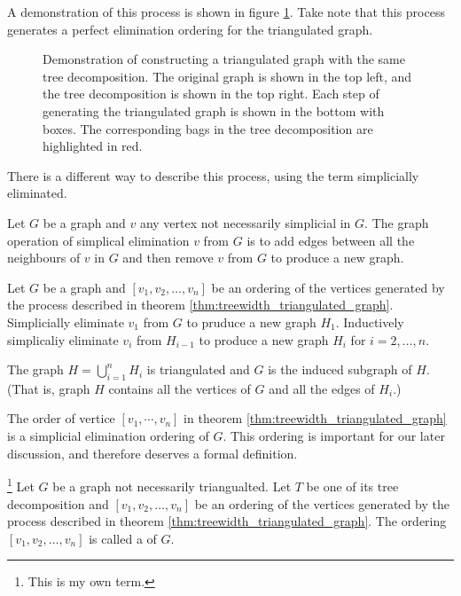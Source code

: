 A demonstration of this process is shown in figure \ref{fig:triangulated_from_tree_decomposition}.
Take note that this process generates a perfect elimination ordering for the triangulated graph.


\begin{figure}[ht]
    \centering 
    \resizebox{1\textwidth}{!}{
        
    }
    \caption{Demonstration of constructing a triangulated graph with the same tree decomposition. The original graph is shown in the top left, and the tree decomposition is shown in the top right. 
    Each step of generating the triangulated graph is shown in the bottom with boxes. The corresponding bags in the tree decomposition are highlighted in red.}
    \label{fig:triangulated_from_tree_decomposition}
\end{figure}

There is a different way to describe this process, using the term simplicially eliminated.

\begin{definition}\label{def:simplicial_elimination}
    Let $G$ be a graph and $v$ any vertex not necessarily simplicial in $G$.
    The graph operation of simplical elimination $v$ from $G$ is to add edges between all the neighbours of $v$ in $G$ and then remove $v$ from $G$ to produce a new graph.
\end{definition}

\begin{corollary}
    Let $G$ be a graph and $[v_1, v_2, \ldots, v_n]$  be an ordering of the vertices generated by the process described in theorem \ref{thm:treewidth_triangulated_graph}.
    Simplicially eliminate $v_1$ from $G$ to pruduce a new graph $H_1$. 
    Inductively simplicaliy eliminate $v_i$ from $H_{i-1}$ to produce a new graph $H_i$ for $i = 2, \ldots, n$.

    The graph $H = \bigcup_{i=1}^{n} H_i$ is triangulated and $G$ is the induced subgraph of $H$. 
    (That is, graph $H$ contains all the vertices of $G$ and all the edges of $H_i$.)
\end{corollary}

The order of vertice $[v_1, \cdots, v_n]$ in theorem \ref{thm:treewidth_triangulated_graph} is a simplicial elimination ordering of $G$. 
This ordering is important for our later discussion, and therefore deserves a formal definition.
\begin{definition}\label{def:simplicial_elimination_ordering}
	\footnote{This is my own term.}
	Let $G$ be a graph not necessarily triangualted. Let $T$ be one of its tree decomposition and $[v_1, v_2, \ldots, v_n]$ be an ordering of the vertices generated by the process described in theorem \ref{thm:treewidth_triangulated_graph}.
	The ordering $[v_1, v_2, \ldots, v_n]$ is called a  of $G$.
\end{definition}


